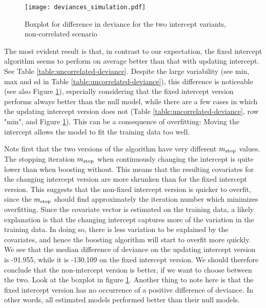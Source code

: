 \begin{figure}
\caption{Boxplot for difference in deviance for the two intercept variants, non-correlated scenario}
\label{fig:simulation-uncorrelated-deviances-boxplot}
\centering
\texttt{[image: deviances\_simulation.pdf]}
\end{figure}

The most evident result is that, in contrast to our expectation, the fixed intercept algorithm seems to perform on average better than that with updating intercept.
See Table \ref{table:uncorrelated-deviance}.
Despite the large variability (see min, max and sd in Table \ref{table:uncorrelated-deviance}), this difference is noticeable (see also Figure \ref{fig:simulation-uncorrelated-deviances-boxplot}), especially considering that the fixed intercept version performs always better than the null model, while there are a few cases in which the updating intercept version does not (Table \ref{table:uncorrelated-deviance}, row "min", and Figure \ref{fig:simulation-uncorrelated-deviances-boxplot}).
This can be a consequence of overfitting:
Moving the intercept allows the model to fit the training data too well.


Note first that the two versions of the algorithm have very different $m_{\text{stop}}$ values.
The stopping iteration $m_{\text{stop}}$ when continuously changing the intercept is quite lower than when boosting without.
This means that the resulting covariates for the changing intercept version are more shrunken than for the fixed intercept version.
This suggests that the non-fixed intercept version is quicker to overfit, since the $m_{\text{stop}}$ should find approximately the iteration number which minimizes overfitting.
Since the covariate vector is estimated on the training data, a likely explanation is that the changing intercept captures more of the variation in the training data.
In doing so, there is less variation to be explained by the covariates, and hence the boosting algorithm will start to overfit more quickly.
We see that the median difference of deviance on the updating intercept version is -91.955, while it is -130.109 on the fixed intercept version.
We should therefore conclude that the non-intercept version is better, if we want to choose between the two.
Look at the boxplot in figure \ref{fig:simulation-uncorrelated-deviances-boxplot}.
Another thing to note here is that the fixed intercept version has no occurrence of a positive difference of deviance.
In other words, all estimated models performed better than their null models.

